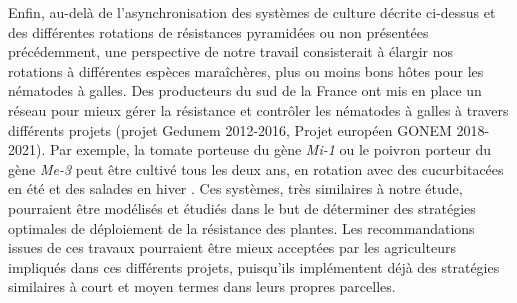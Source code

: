 	Enfin, au-delà de l'asynchronisation des systèmes de culture décrite ci-dessus et des différentes rotations de résistances pyramidées ou non présentées précédemment, une perspective de notre travail consisterait à élargir nos rotations à différentes espèces maraîchères, plus ou moins bons hôtes pour les nématodes à galles.  
Des producteurs du sud de la France ont mis en place un réseau pour mieux gérer la résistance et contrôler les nématodes à galles à travers différents projets (projet Gedunem 2012-2016,
Projet européen GONEM 2018-2021). Par exemple,  la tomate porteuse du gène \textit{Mi-1}  ou le poivron porteur du gène \textit{Me-3} peut être cultivé tous les deux ans, en rotation avec des cucurbitacées en été et des salades en hiver \citep{Talavera2009, Gine2017}.
Ces systèmes, très similaires à notre étude, pourraient être modélisés et étudiés dans le but de déterminer des stratégies  optimales de  déploiement de la résistance des plantes. Les recommandations issues de ces travaux pourraient être  mieux acceptées par les agriculteurs impliqués dans ces différents projets, puisqu'ils implémentent déjà  des stratégies similaires à court et moyen termes dans leurs propres parcelles. %
	
